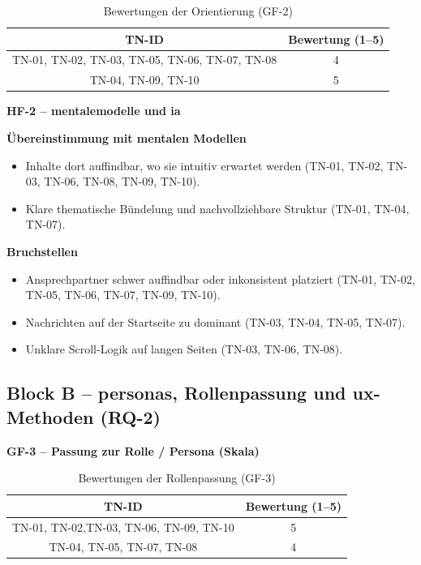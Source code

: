 \begin{table}[H]
  \centering
  \caption{Bewertungen der Orientierung (GF-2)}
  \label{tab:BB-gf2}
  \begin{tabular}{c c}
    \toprule
    TN-ID                                           & Bewertung (1--5) \\
    \midrule
    TN-01, TN-02, TN-03, TN-05, TN-06, TN-07, TN-08 & 4                \\
    TN-04, TN-09, TN-10                             & 5                \\
    \bottomrule
  \end{tabular}
\end{table}


\vspace{2em}
\textbf{HF-2 -- \Gls{mentalemodelle} und \Gls{ia}}

\textbf{Übereinstimmung mit mentalen Modellen}
\begin{itemize}
  \item Inhalte dort auffindbar, wo sie intuitiv erwartet werden (TN-01, TN-02, TN-03, TN-06, TN-08, TN-09, TN-10).
  \item Klare thematische Bündelung und nachvollziehbare Struktur (TN-01, TN-04, TN-07).
\end{itemize}

\textbf{Bruchstellen}
\begin{itemize}
  \item Ansprechpartner schwer auffindbar oder inkonsistent platziert (TN-01, TN-02, TN-05, TN-06, TN-07, TN-09, TN-10).
  \item Nachrichten auf der Startseite zu dominant (TN-03, TN-04, TN-05, TN-07).
  \item Unklare Scroll-Logik auf langen Seiten (TN-03, TN-06, TN-08).
\end{itemize}

\vspace{2em}
\newpage
\subsection{Block B -- \Gls{personas}, Rollenpassung und \Gls{ux}-Methoden (RQ-2)}

\textbf{GF-3 -- Passung zur Rolle / Persona (Skala)}

\begin{table}[H]
  \centering
  \caption{Bewertungen der Rollenpassung (GF-3)}
  \label{tab:BB-gf3}
  \begin{tabular}{c c}
    \toprule
    TN-ID                                   & Bewertung (1--5) \\
    \midrule
    TN-01, TN-02,TN-03, TN-06, TN-09, TN-10 & 5                \\
    TN-04, TN-05, TN-07, TN-08              & 4                \\
    \bottomrule
  \end{tabular}
\end{table}

